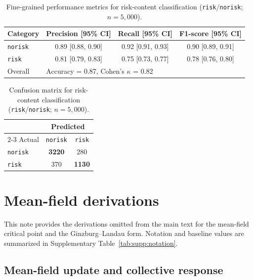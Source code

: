 \documentclass[11pt]{article}
\begin{document}
\begin{table}[H]
  \centering
  \caption{Fine-grained performance metrics for risk-content classification (\texttt{risk}/\texttt{norisk}; $n=5{,}000$).}
  \label{tab:supp:llm-risk-metrics}
  \footnotesize
  \begin{tabular}{@{}lccc@{}}
    \toprule
    Category & Precision [95\% CI] & Recall [95\% CI] & F1-score [95\% CI] \\
    \midrule
    \texttt{norisk} & 0.89 [0.88, 0.90] & 0.92 [0.91, 0.93] & 0.90 [0.89, 0.91] \\
    \texttt{risk} & 0.81 [0.79, 0.83] & 0.75 [0.73, 0.77] & 0.78 [0.76, 0.80] \\
    \midrule
    Overall & \multicolumn{3}{l}{Accuracy = 0.87, Cohen's $\kappa$ = 0.82} \\
    \bottomrule
  \end{tabular}
\end{table}

\begin{table}[H]
  \centering
  \caption{Confusion matrix for risk-content classification (\texttt{risk}/\texttt{norisk}; $n=5{,}000$).}
  \label{tab:supp:llm-risk-confusion}
  \footnotesize
  \begin{tabular}{@{}lcc@{}}
    \toprule
    & \multicolumn{2}{c}{Predicted} \\
    \cmidrule(l){2-3}
    Actual & \texttt{norisk} & \texttt{risk} \\
    \midrule
    \texttt{norisk} & \textbf{3220} & 280 \\
    \texttt{risk} & 370 & \textbf{1130} \\
    \bottomrule
  \end{tabular}
\end{table}

\section{Mean-field derivations}
\label{supp:s2-mean-field}

This note provides the derivations omitted from the main text for the mean-field critical point and the Ginzburg--Landau form.
\noindent Notation and baseline values are summarized in Supplementary Table~\ref{tab:supp:notation}.

\subsection{Mean-field update and collective response}
\end{document}
